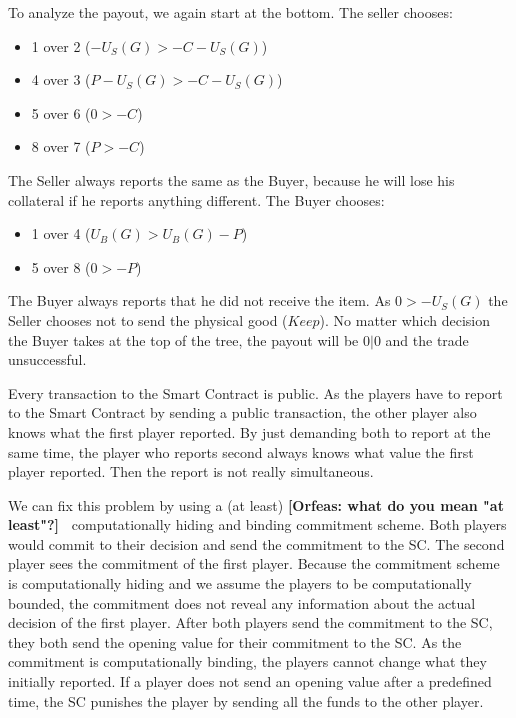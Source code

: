 \documentclass{cacthesis}
\newcommand{\authnote}[3]{{ \footnotesize \textbf{#1[#2: #3]~}}}
\newcommand{\orfnote}[1]{\authnote{\color{blue}}{Orfeas}{#1}}
\begin{document}
To analyze the payout, we again start at the bottom. The seller chooses:
\begin{itemize}
    \item 1 over 2 ($-U_S(G)>-C - U_S(G)$)
    \item 4 over 3 ($P-U_S(G)> -C-U_S(G)$)
    \item 5 over 6 ($0 > -C$)
    \item 8 over 7 ($P > -C$)
\end{itemize}
The Seller always reports the same as the Buyer, because he will lose his collateral if he reports anything different.\newline
The Buyer chooses:
\begin{itemize}
    \item 1 over 4 ($U_B(G)>U_B(G) - P$)
    \item 5 over 8 ($0>-P$)
\end{itemize}
The Buyer always reports that he did not receive the item.\newline
As $0 > -U_S(G)$ the Seller chooses not to send the physical good ($Keep$).\newline
No matter which decision the Buyer takes at the top of the tree, the payout will be $0|0$ and the trade unsuccessful.


 Every transaction to the Smart Contract is public. As the players have to
 report to the Smart Contract by sending a public transaction, the other player
 also knows what the first player reported. By just demanding both to report at
 the same time, the player who reports second always knows what value the first player reported. Then the report is not really simultaneous.\newline

 We can fix this problem by using a (at least) \orfnote{what do you mean "at
 least"?} computationally hiding and binding commitment scheme. Both players would commit to their decision and send the commitment to the SC. The second player sees the commitment of the first player. Because the commitment scheme is computationally hiding and we assume the players to be computationally bounded, the commitment does not reveal any information about the actual decision of the first player. \newline
 After both players send the commitment to the SC, they both send the opening
 value for their commitment to the SC. As the commitment is computationally
 binding, the players cannot change what they initially reported. If a player
 does not send an opening value after a predefined time, the SC punishes the
 player by sending all the funds to the other player.
\end{document}
